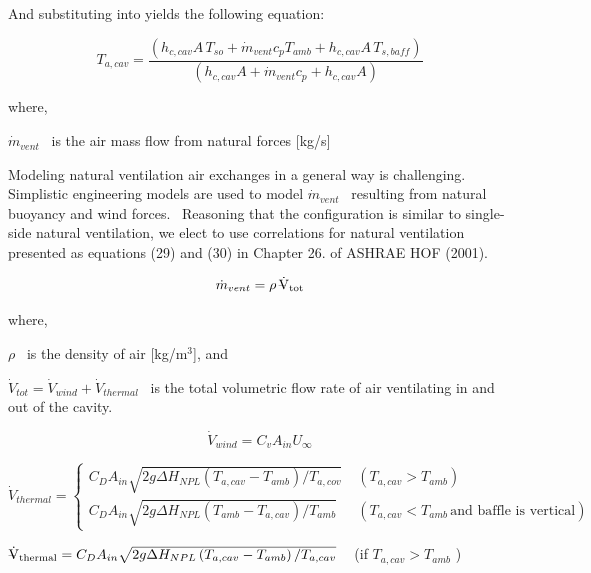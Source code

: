 {And substituting into yields the following equation:

\begin{equation}
{T_{a,cav}} = \frac{{\left( {{h_{c,cav}}A\,{T_{so}} + {{\dot m}_{vent}}{c_p}{T_{amb}} + {h_{c,cav}}A\,{T_{s,baff}}} \right)}}{{\left( {{h_{c,cav}}A + {{\dot m}_{vent}}{c_p} + {h_{c,cav}}A} \right)}}
\end{equation}

where,

\({\dot m_{vent}}\) ~is the air mass flow from natural forces {[}kg/s{]}

Modeling natural ventilation air exchanges in a general way is challenging.~ Simplistic engineering models are used to model \({\dot m_{vent}}\) ~resulting from natural buoyancy and wind forces.~ Reasoning that the configuration is similar to single-side natural ventilation, we elect to use correlations for natural ventilation presented as equations (29) and (30) in Chapter 26. of ASHRAE HOF (2001).

\begin{equation}
{\dot m_{vent}} = \rho \,{{\rm{\rlap{--} \dot V}}_{{\rm{tot}}}}
\end{equation}

where,

\(\rho\) ~is the density of air {[}kg/m\(^{3}\){]}, and

\(\dot{V}_{tot} = \dot{V}_{wind} + \dot{V}_{thermal}\) ~is the total volumetric flow rate of air ventilating in and out of the cavity.

\begin{equation}
\dot{V}_{wind} = C_{v}A_{in}U_{\infty}
\end{equation}

\begin{equation}
\dot{V}_{thermal} = \left\{
    \begin{array}{cl}
      C_{D}A_{in}\sqrt{2g\Delta H_{NPL}\left(T_{a,cav}-T_{amb}\right)/T_{a,cov}} & \; \left(T_{a,cav}>T_{amb}\right) \\
      C_{D}A_{in}\sqrt{2g\Delta H_{NPL}\left(T_{amb}-T_{a,cav}\right)/T_{amb}} & \; \left(T_{a,cav} \lt T_{amb}\,\text{and baffle is vertical}\right) 
    \end{array}
  \right.
\end{equation}

\({{\rm{\rlap{--} \dot V}}_{{\rm{thermal}}}} = {C_D}{A_{in}}\sqrt {2g\Delta {H_{NPL}}\left( {{T_{a,cav}} - {T_{amb}}} \right)/{T_{a,cav}}}\) ~ (if \(T_{a,cav} > T_{amb}\) )

}
